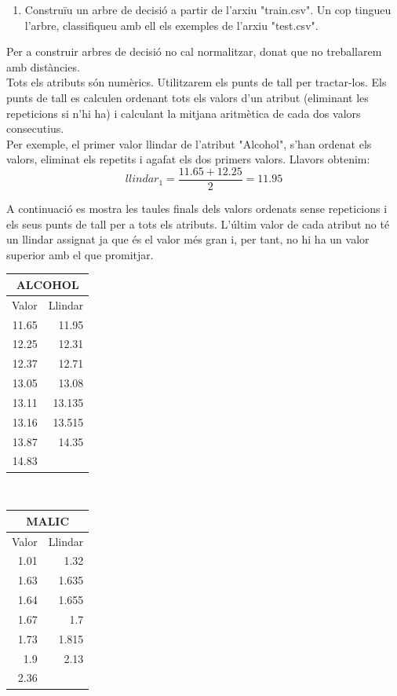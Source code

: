 \documentclass{article} %
\begin{document}
\begin{enumerate}[resume, label=\alph*]
	\item Construïu un arbre de decisió a partir de l'arxiu "train.csv". Un cop tingueu l'arbre, classifiqueu amb ell els exemples de l'arxiu "test.csv". 
\end{enumerate}
{\color{blue}
	Per a construir arbres de decisió no cal normalitzar, donat que no treballarem amb distàncies. \\

	Tots els atributs són numèrics. Utilitzarem els punts de tall per tractar-los. Els punts de tall es calculen ordenant tots els valors d'un atribut (eliminant les repeticions si n’hi ha) i calculant la mitjana aritmètica de cada dos valors consecutius. \\

	Per exemple, el primer valor llindar de l'atribut "Alcohol", s'han ordenat els valors, eliminat els repetits i agafat els dos primers valors. Llavors obtenim: \\
	\[llindar_1 = \frac{11.65 + 12.25}{2} = 11.95\]

	A continuació es mostra les taules finals dels valors ordenats sense repeticions i els seus punts de tall per a tots els atributs. L'últim valor de cada atribut no té un llindar assignat ja que és el valor més gran i, per tant, no hi ha un valor superior amb el que promitjar. \\


	{\selectfont\small
	\begin{tabular}{r | r}
	 	\multicolumn{2}{c}{ALCOHOL}  \\ \hline
	 	Valor & Llindar \\ \hline
		11.65 & 11.95 \\
		12.25 & 12.31 \\
		12.37 & 12.71 \\
		13.05 & 13.08 \\
		13.11 & 13.135 \\
		13.16 & 13.515 \\
		13.87 & 14.35 \\
		14.83 &  \\
	\end{tabular}
	} \\

	{\selectfont\small
	\begin{tabular}{r | r}
	 	\multicolumn{2}{c}{MALIC}  \\ \hline
	 	Valor & Llindar \\ \hline
		1.01 & 1.32 \\
		1.63 & 1.635 \\
		1.64 & 1.655 \\
		1.67 & 1.7 \\
		1.73 & 1.815 \\
		1.9 & 2.13 \\
		2.36 &  \\
	\end{tabular}
	} \\

}
\end{document}
